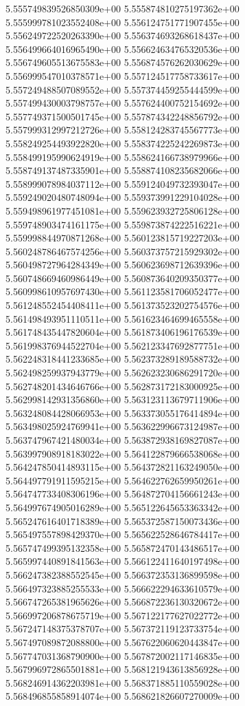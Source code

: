 5.555749839526850309e+00
5.555874810275197362e+00
5.555999781023552408e+00
5.556124751771907455e+00
5.556249722520263390e+00
5.556374693268618437e+00
5.556499664016965490e+00
5.556624634765320536e+00
5.556749605513675583e+00
5.556874576262030629e+00
5.556999547010378571e+00
5.557124517758733617e+00
5.557249488507089552e+00
5.557374459255444599e+00
5.557499430003798757e+00
5.557624400752154692e+00
5.557749371500501745e+00
5.557874342248856792e+00
5.557999312997212726e+00
5.558124283745567773e+00
5.558249254493922820e+00
5.558374225242269873e+00
5.558499195990624919e+00
5.558624166738979966e+00
5.558749137487335901e+00
5.558874108235682066e+00
5.558999078984037112e+00
5.559124049732393047e+00
5.559249020480748094e+00
5.559373991229104028e+00
5.559498961977451081e+00
5.559623932725806128e+00
5.559748903474161175e+00
5.559873874222516221e+00
5.559998844970871268e+00
5.560123815719227203e+00
5.560248786467574256e+00
5.560373757215929302e+00
5.560498727964284349e+00
5.560623698712639396e+00
5.560748669460986449e+00
5.560873640209350377e+00
5.560998610957697430e+00
5.561123581706052477e+00
5.561248552454408411e+00
5.561373523202754576e+00
5.561498493951110511e+00
5.561623464699465558e+00
5.561748435447820604e+00
5.561873406196176539e+00
5.561998376944522704e+00
5.562123347692877751e+00
5.562248318441233685e+00
5.562373289189588732e+00
5.562498259937943779e+00
5.562623230686291720e+00
5.562748201434646766e+00
5.562873172183000925e+00
5.562998142931356860e+00
5.563123113679711906e+00
5.563248084428066953e+00
5.563373055176414894e+00
5.563498025924769941e+00
5.563622996673124987e+00
5.563747967421480034e+00
5.563872938169827087e+00
5.563997908918183022e+00
5.564122879666538068e+00
5.564247850414893115e+00
5.564372821163249050e+00
5.564497791911595215e+00
5.564622762659950261e+00
5.564747733408306196e+00
5.564872704156661243e+00
5.564997674905016289e+00
5.565122645653363342e+00
5.565247616401718389e+00
5.565372587150073436e+00
5.565497557898429370e+00
5.565622528646784417e+00
5.565747499395132358e+00
5.565872470143486517e+00
5.565997440891841563e+00
5.566122411640197498e+00
5.566247382388552545e+00
5.566372353136899598e+00
5.566497323885255533e+00
5.566622294633610579e+00
5.566747265381965626e+00
5.566872236130320672e+00
5.566997206878675719e+00
5.567122177627022772e+00
5.567247148375378707e+00
5.567372119123733754e+00
5.567497089872088800e+00
5.567622060620443847e+00
5.567747031368790900e+00
5.567872002117146835e+00
5.567996972865501881e+00
5.568121943613856928e+00
5.568246914362203981e+00
5.568371885110559028e+00
5.568496855858914074e+00
5.568621826607270009e+00

